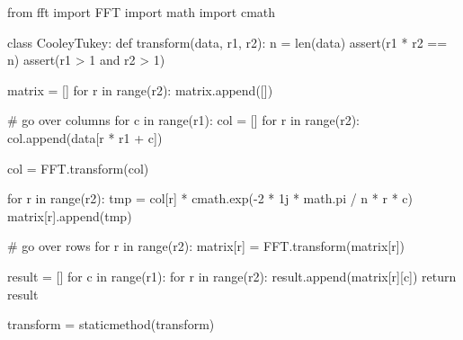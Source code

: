\begin{python}
from fft import FFT
import math
import cmath

class CooleyTukey:
    def transform(data, r1, r2):
        n = len(data)
        assert(r1 * r2 == n)
        assert(r1 > 1 and r2 > 1)
        
        matrix = []
        for r in range(r2):
            matrix.append([])
            
        # go over columns
        for c in range(r1):
            col = []
            for r in range(r2):
                col.append(data[r * r1 + c])
                
            col = FFT.transform(col)
            
            for r in range(r2):
                tmp = col[r] * cmath.exp(-2 * 1j * math.pi / n * r * c) 
                matrix[r].append(tmp)
            
        # go over rows
        for r in range(r2):
            matrix[r] = FFT.transform(matrix[r])
            
        result = []
        for c in range(r1):
            for r in range(r2):
                result.append(matrix[r][c])
        return result
        
    transform = staticmethod(transform)
\end{python}
